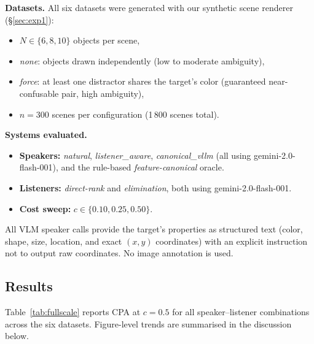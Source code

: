 \documentclass[11pt]{article}
\begin{document}
\textbf{Datasets.}  All six datasets were generated with our synthetic scene
renderer (\S\ref{sec:exp1}):
\begin{itemize}
    \item $N \in \{6, 8, 10\}$ objects per scene,
    \item \textit{none}: objects drawn independently (low to moderate ambiguity),
    \item \textit{force}: at least one distractor shares the target's color
          (guaranteed near-confusable pair, high ambiguity),
    \item $n = 300$ scenes per configuration (1\,800 scenes total).
\end{itemize}

\textbf{Systems evaluated.}
\begin{itemize}
    \item \textbf{Speakers:} \textit{natural}, \textit{listener\_aware},
          \textit{canonical\_vllm} (all using gemini-2.0-flash-001), and the
          rule-based \textit{feature-canonical} oracle.
    \item \textbf{Listeners:} \textit{direct-rank} and \textit{elimination},
          both using gemini-2.0-flash-001.
    \item \textbf{Cost sweep:} $c \in \{0.10, 0.25, 0.50\}$.
\end{itemize}

All VLM speaker calls provide the target's properties as structured text
(color, shape, size, location, and exact $(x,y)$ coordinates) with an explicit
instruction not to output raw coordinates.  No image annotation is used.

\subsection{Results}

Table~\ref{tab:fullscale} reports CPA at $c{=}0.5$ for all
speaker--listener combinations across the six datasets.
Figure-level trends are summarised in the discussion below.
\end{document}
